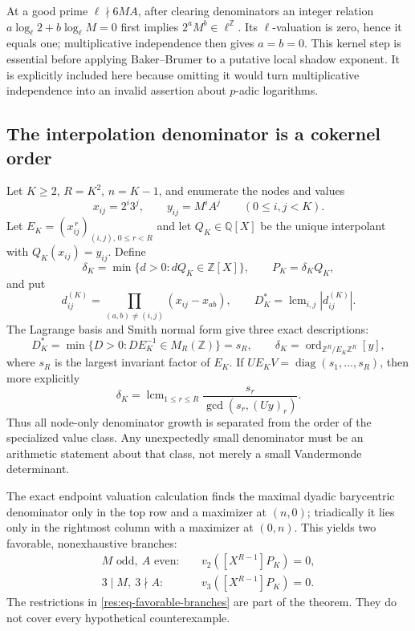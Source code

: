 \documentclass[11pt,oneside]{article}
\theoremstyle{definition}
\theoremstyle{remark}
\newcommand{\Z}{\mathbb Z}
\newcommand{\Q}{\mathbb Q}
\begin{document}
At a good prime $\ell\nmid6MA$, after clearing denominators an integer relation
$a\log_\ell2+b\log_\ell M=0$ first implies
$2^aM^b\in\ell^\Z$.  Its $\ell$-valuation is zero, hence it equals one; multiplicative
independence then gives $a=b=0$.  This kernel step is essential before applying
Baker--Brumer to a putative local shadow exponent.  It is explicitly included here because
omitting it would turn multiplicative independence into an invalid assertion about
$p$-adic logarithms.

\subsection{The interpolation denominator is a cokernel order}
\label{res:denominator-lattice}

Let $K\ge2$, $R=K^2$, $n=K-1$, and enumerate the nodes and values
\[
 x_{ij}=2^i3^j,\qquad y_{ij}=M^iA^j\qquad(0\le i,j<K).
\]
Let $E_K=(x_{ij}^{\,r})_{(i,j),\,0\le r<R}$ and let $Q_K\in\Q[X]$ be the unique
interpolant with $Q_K(x_{ij})=y_{ij}$.  Define
\[
 \delta_K=\min\{d>0:dQ_K\in\Z[X]\},\qquad P_K=\delta_KQ_K,
\]
and put
\[
 d_{ij}^{(K)}=\prod_{(a,b)\ne(i,j)}(x_{ij}-x_{ab}),
 \qquad D_K^*=\operatorname{lcm}_{i,j}|d_{ij}^{(K)}|.
\]
The Lagrange basis and Smith normal form give three exact descriptions:
\begin{equation}
 D_K^*=\min\{D>0:DE_K^{-1}\in M_R(\Z)\}=s_R,
 \qquad
 \delta_K=\operatorname{ord}_{\Z^R/E_K\Z^R}[y],
 \label{res:eq-denominator-cokernel}
\end{equation}
where $s_R$ is the largest invariant factor of $E_K$.  If
$UE_KV=\operatorname{diag}(s_1,\ldots,s_R)$, then more explicitly
\[
 \delta_K=\operatorname{lcm}_{1\le r\le R}
 \frac{s_r}{\gcd(s_r,(Uy)_r)}.
\]
Thus all node-only denominator growth is separated from the order of the specialized value
class.  Any unexpectedly small denominator must be an arithmetic statement about that class,
not merely a small Vandermonde determinant.

The exact endpoint valuation calculation finds the maximal dyadic barycentric denominator
only in the top row and a maximizer at $(n,0)$; triadically it lies only in the rightmost
column with a maximizer at $(0,n)$.  This yields two favorable, nonexhaustive branches:
\begin{align}
 M\text{ odd},\ A\text{ even}:&\quad
   v_2([X^{R-1}]P_K)=0,\\
 3\mid M,\ 3\nmid A:&\quad
   v_3([X^{R-1}]P_K)=0.
 \label{res:eq-favorable-branches}
\end{align}
The restrictions in \eqref{res:eq-favorable-branches} are part of the theorem.  They do not
cover every hypothetical counterexample.
\end{document}
